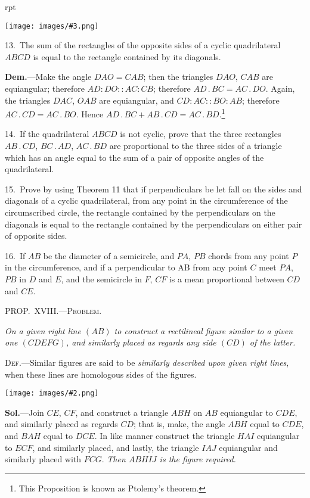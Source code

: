 \documentclass[oneside]{book}
\newcounter{wrapwidth}
\newcommand\mypropl[2]{
\bigskip\Needspace*{4\baselineskip}\begin{center}\textsc{#1}\end{center}
\hspace{\parindent}\emph{#2}\par\medskip
}
\newcommand\imgflow[3]{
\setcounter{wrapwidth}{#1}
\begin{wrapfigure}[#2]{r}{\value{wrapwidth}pt}
\begin{center}
\vspace{-0.3in}
\texttt{[image: images/\#3.png]}
\end{center}
\end{wrapfigure}
}
\newcommand\imgcent[2]{
\begin{center}
\texttt{[image: images/\#2.png]}
\end{center}
}
\begin{document}
\begin{footnotesize}
\imgflow{108}{11}{f194}

13.~The sum of the rectangles of the opposite sides of a cyclic
quadrilateral $ABCD$ is equal to the rectangle
contained by its diagonals.

\textbf{Dem.}---Make the angle $DAO = CAB$;
then the triangles $DAO$, $CAB$ are equiangular;
therefore $AD : DO :: AC : CB$;
therefore $AD\,.\,BC = AC\,.\,DO$. Again,
the triangles $DAC$, $OAB$ are equiangular,
and $CD : AC :: BO : AB$; therefore
$AC\,.\,CD = AC\,.\,BO$. Hence $AD\,.\,BC
+ AB\,.\,CD = AC\,.\,BD$.\footnote
 {This Proposition is known as Ptolemy's theorem.}

14.~If the quadrilateral $ABCD$ is not cyclic, prove that the
three rectangles $AB\,.\,CD$, $BC\,.\,AD$, $AC\,.\,BD$ are proportional to
the three sides of a triangle which has an angle equal to the sum
of a pair of opposite angles of the quadrilateral.

15.~Prove by using Theorem 11 that if perpendiculars be let
fall on the sides and diagonals of a cyclic quadrilateral, from any
point in the circumference of the circumscribed circle, the rectangle
contained by the perpendiculars on the diagonals is equal
to the rectangle contained by the perpendiculars on either pair of
opposite sides.

16.~If $AB$ be the diameter of a semicircle, and $PA$, $PB$ chords
from any point $P$ in the circumference, and if a perpendicular to
AB from any point $C$ meet $PA$, $PB$ in $D$ and $E$, and the semicircle
in $F$, $CF$ is a mean proportional between $CD$ and $CE$.
\par\end{footnotesize}

\mypropl{PROP\@.~XVIII\@.---Problem.}{On a given right line $(AB)$ to construct a rectilineal
figure similar to a given one $(CDEFG)$, and similarly
placed as regards any side $(CD)$ of the latter.}

\textsc{Def.}---Similar figures are said to be \emph{similarly described
upon given right lines}, when these lines are homologous
sides of the figures.

\imgcent{270}{f195}


\textbf{Sol.}---Join $CE$, $CF$, and construct a triangle $ABH$
on $AB$ equiangular to $CDE$, and similarly placed as
regards $CD$; that is, make, the angle $ABH$ equal to
$CDE$, and $BAH$ equal to $DCE$. In like manner construct
the triangle $HAI$ equiangular to $ECF$, and similarly
placed, and lastly, the triangle $IAJ$ equiangular
and similarly placed with $FCG$. \emph{Then $ABHIJ$ is the
figure required.}
\end{document}
